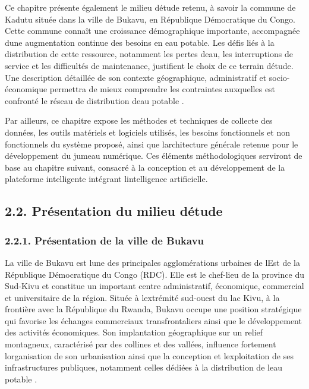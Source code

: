 \documentclass[12pt,a4paper,oneside]{report}
\begin{document}
Ce chapitre présente également le milieu d\textquotesingle étude retenu,
à savoir la commune de Kadutu située dans la ville de Bukavu, en
République Démocratique du Congo. Cette commune connaît une croissance
démographique importante, accompagnée d\textquotesingle une augmentation
continue des besoins en eau potable. Les défis liés à la distribution de
cette ressource, notamment les pertes d\textquotesingle eau, les
interruptions de service et les difficultés de maintenance, justifient
le choix de ce terrain d\textquotesingle étude. Une description
détaillée de son contexte géographique, administratif et
socio-économique permettra de mieux comprendre les contraintes
auxquelles est confronté le réseau de distribution d\textquotesingle eau
potable \cite{ref82}.

Par ailleurs, ce chapitre expose les méthodes et techniques de collecte
des données, les outils matériels et logiciels utilisés, les besoins
fonctionnels et non fonctionnels du système proposé, ainsi que
l\textquotesingle architecture générale retenue pour le développement du
jumeau numérique. Ces éléments méthodologiques serviront de base au
chapitre suivant, consacré à la conception et au développement de la
plateforme intelligente intégrant l\textquotesingle intelligence
artificielle.

\subsection{\texorpdfstring{\textbf{2.2. Présentation du milieu
d\textquotesingle étude}}{2.2. Présentation du milieu d\textquotesingle étude}}\label{pruxe9sentation-du-milieu-duxe9tude}

\subsubsection{2.2.1. Présentation de la ville de
Bukavu}\label{pruxe9sentation-de-la-ville-de-bukavu}

La ville de Bukavu est l\textquotesingle une des principales
agglomérations urbaines de l\textquotesingle Est de la République
Démocratique du Congo (RDC). Elle est le chef-lieu de la province du
Sud-Kivu et constitue un important centre administratif, économique,
commercial et universitaire de la région. Située à
l\textquotesingle extrémité sud-ouest du lac Kivu, à la frontière avec
la République du Rwanda, Bukavu occupe une position stratégique qui
favorise les échanges commerciaux transfrontaliers ainsi que le
développement des activités économiques. Son implantation géographique
sur un relief montagneux, caractérisé par des collines et des vallées,
influence fortement l\textquotesingle organisation de son urbanisation
ainsi que la conception et l\textquotesingle exploitation de ses
infrastructures publiques, notamment celles dédiées à la distribution de
l\textquotesingle eau potable \cite{ref83}.
\end{document}
